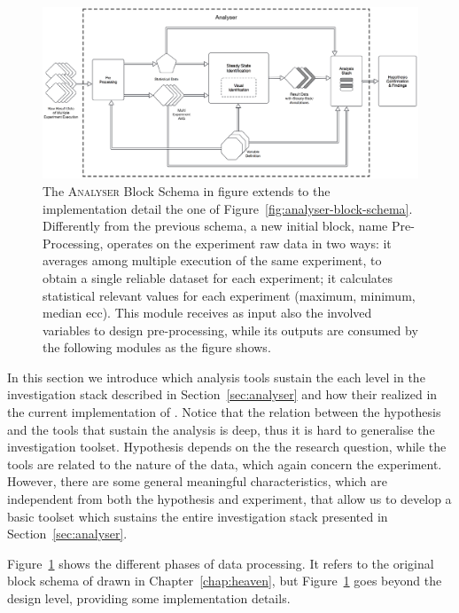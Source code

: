 \begin{figure}[tbh]
  \centering
	\includegraphics[width=\linewidth]{images/analyser-block-schema-impl}
	\caption[\textsc{Analyser} Block Schema: Implementation Detail Level]{The \textsc{Analyser} Block Schema in figure extends to the implementation detail the one of Figure~\ref{fig:analyser-block-schema}. Differently from the previous schema, a new initial block, name Pre-Processing, operates on the experiment raw data in two ways: it averages among multiple execution of the same experiment, to obtain a single reliable dataset for each experiment; it calculates statistical relevant values for each experiment (maximum, minimum, median ecc). This module receives as input also the involved variables to design pre-processing, while its outputs are consumed by the following modules as the figure shows.}
  	\label{fig:analyser-block-schema-impl}
\end{figure}

\noindent In this section we introduce which analysis tools sustain the each level in the investigation stack described in Section~\ref{sec:analyser} and how their realized in the current implementation of \name. Notice that the relation between the hypothesis and the tools that sustain the analysis is deep, thus it is hard to generalise the investigation toolset. Hypothesis depends on the the research question, while the tools are related to the nature of the data, which again concern the experiment.  However, there are some general meaningful characteristics, which are independent from both the hypothesis and experiment, that allow us to develop a basic toolset which sustains the entire investigation stack presented in Section~\ref{sec:analyser}.

Figure~\ref{fig:analyser-block-schema-impl} shows the different phases of data processing. It refers to the original block schema of drawn in Chapter~\ref{chap:heaven}, but Figure~\ref{fig:analyser-block-schema-impl} goes beyond the design level, providing some implementation details. 

